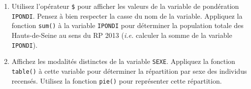 \documentclass[12pt,twosided, notitlepage]{book}
\newenvironment{Shaded}{}{}
\newcommand{\CommentTok}[1]{\textcolor[rgb]{0.00,0.50,0.00}{#1}}
\newcommand{\KeywordTok}[1]{\textcolor[rgb]{0.00,0.00,1.00}{#1}}
\newcommand{\NormalTok}[1]{#1}
\newcommand{\OperatorTok}[1]{#1}
\newif \ifsol
\renewenvironment{Shaded}{\begin{snugshade}}{\end{snugshade}}
\begin{document}
\begin{enumerate}
  \begin{center} \rule{0.5\linewidth}{\linethickness}\end{center} 
    \bigskip 
    \fi
\item
  Utilisez l'opérateur \texttt{\$}\index{\texttt{\$}} pour afficher les
  valeurs de la variable de pondération \texttt{IPONDI}. Pensez à bien
  respecter la casse du nom de la variable. Appliquez la fonction
  \texttt{sum()} à la variable \texttt{IPONDI} pour
  déterminer la population totale des Hauts-de-Seine au sens du RP 2013
  (\emph{i.e.} calculer la somme de la variable \texttt{IPONDI}).

  \ifsol 

  \begin{center} \rule{0.5\linewidth}{\linethickness}\end{center}

\begin{Shaded}
\begin{Highlighting}[]
\CommentTok{# Affichage du contenu de la variable IPONDI}
\NormalTok{rp}\OperatorTok{$}\NormalTok{IPONDI}
\CommentTok{# Note : pour des raisons de présentation, seules les 20 premières valeurs}
\CommentTok{# sont affichées ici.}
\end{Highlighting}
\end{Shaded}

\begin{verbatim}
  ##  [1] 3.4927574 3.4927574 3.4927574 1.1016688 1.1016688 1.1016688
  ##  [7] 1.1016688 3.6388523 3.6388523 0.8573350 0.8573350 3.7741295
  ## [13] 3.7741295 3.5340019 1.0162282 1.0343014 1.0343014 0.8821233
  ## [19] 0.8821233 3.3128186
\end{verbatim}

\begin{Shaded}
\begin{Highlighting}[]
\KeywordTok{sum}\NormalTok{(rp}\OperatorTok{$}\NormalTok{IPONDI)}
\NormalTok{  ## [1] 1591365}
\CommentTok{# La population des Hauts-de-Seine au sens du RP 2013 est de}
\CommentTok{# 1 591 365 habitants.}
\end{Highlighting}
\end{Shaded}

  \begin{center} \rule{0.5\linewidth}{\linethickness}\end{center} 
    \bigskip 
    \fi
\item
  Affichez les modalités distinctes de la variable
  \texttt{SEXE}. Appliquez la fonction
  \texttt{table()} à cette variable pour
  déterminer la répartition par sexe des individus recensés. Utilisez la
  fonction \texttt{pie()} pour représenter cette
  répartition.


\end{enumerate}
\end{document}
